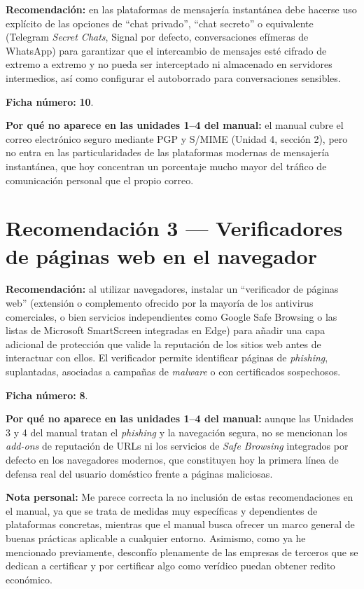 \textbf{Recomendación:} en las plataformas de mensajería instantánea debe hacerse uso explícito de las opciones de ``chat privado'', ``chat secreto'' o equivalente (Telegram \textit{Secret Chats}, Signal por defecto, conversaciones efímeras de WhatsApp) para garantizar que el intercambio de mensajes esté cifrado de extremo a extremo y no pueda ser interceptado ni almacenado en servidores intermedios, así como configurar el autoborrado para conversaciones sensibles.

\textbf{Ficha número:} \textbf{10}.

\textbf{Por qué no aparece en las unidades 1--4 del manual:} el manual cubre el correo electrónico seguro mediante PGP y S/MIME (Unidad 4, sección 2), pero no entra en las particularidades de las plataformas modernas de mensajería instantánea, que hoy concentran un porcentaje mucho mayor del tráfico de comunicación personal que el propio correo.

\vspace{0.6cm}

\section*{Recomendación 3 --- Verificadores de páginas web en el navegador}

\textbf{Recomendación:} al utilizar navegadores, instalar un ``verificador de páginas web'' (extensión o complemento ofrecido por la mayoría de los antivirus comerciales, o bien servicios independientes como Google Safe Browsing o las listas de Microsoft SmartScreen integradas en Edge) para añadir una capa adicional de protección que valide la reputación de los sitios web antes de interactuar con ellos. El verificador permite identificar páginas de \textit{phishing}, suplantadas, asociadas a campañas de \textit{malware} o con certificados sospechosos.

\textbf{Ficha número:} \textbf{8}.

\textbf{Por qué no aparece en las unidades 1--4 del manual:} aunque las Unidades 3 y 4 del manual tratan el \textit{phishing} y la navegación segura, no se mencionan los \textit{add-ons} de reputación de URLs ni los servicios de \textit{Safe Browsing} integrados por defecto en los navegadores modernos, que constituyen hoy la primera línea de defensa real del usuario doméstico frente a páginas maliciosas.

\textbf{Nota personal:} Me parece correcta la no inclusión de estas recomendaciones en el manual, ya que se trata de medidas muy específicas y dependientes de plataformas concretas, mientras que el manual busca ofrecer un marco general de buenas prácticas aplicable a cualquier entorno. Asimismo, como ya he mencionado previamente, desconfío plenamente de las empresas de terceros que se dedican a certificar y por certificar algo como verídico puedan obtener redito económico.